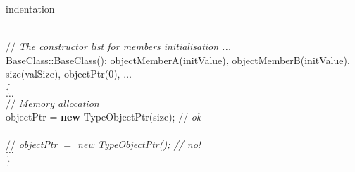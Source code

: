 %
%
\expandafter\ifx\csname indentation\endcsname\relax%
\newlength{\indentation}\fi
\setlength{\indentation}{0.5em}
\begin{flushleft}
\mbox{}\\
{$//$\it{} The constructor list for members initialisation ...{}\mbox{}\\
}BaseClass::BaseClass():  objectMemberA(initValue), objectMemberB(initValue), size(valSize), objectPtr(0), $\ldots$ \mbox{}\\
\{\mbox{}\\
$\ldots$\mbox{}\\
{$//$\it{} Memory allocation{}\mbox{}\\
}\hspace*{1\indentation}objectPtr = {\bf new} TypeObjectPtr(size); {$//$\it{} ok {}\mbox{}\\
}\hspace*{1\indentation}\mbox{}\\
{$//$\it{}  objectPtr $=$ new TypeObjectPtr(); // no!  {}\mbox{}\\
}$\ldots$\mbox{}\\
\}\mbox{}\\
\mbox{}\\
\mbox{}\\
\end{flushleft}

